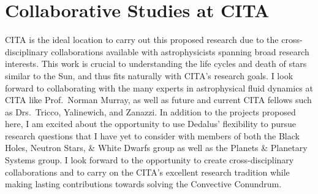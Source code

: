 \documentclass[preprint, hmargin=1in, vmargin=1in]{aastex62}
\begin{document}
\section*{\textbf{Collaborative Studies at CITA}}
CITA is the ideal location to carry out this proposed research due to the cross-disciplinary collaborations available with astrophysicists spanning broad research interests.
This work is crucial to understanding the life cycles and death of stars similar to the Sun, and thus fits naturally with CITA's research goals.
I look forward to collaborating with the many experts in astrophysical fluid dynamics at CITA like Prof.~Norman Murray, as well as future and current CITA fellows such as Drs.~Tricco, Yalinewich, and Zanazzi.
In addition to the projects proposed here, I am excited about the opportunity to use Dedalus' flexibility to pursue research questions that I have yet to consider with members of both the Black Holes, Neutron Stars, \& White Dwarfs group as well as the Planets \& Planetary Systems group.
I look forward to the opportunity to create cross-disciplinary collaborations and to carry on the CITA's excellent research tradition while making lasting contributions towards solving the Convective Conundrum.



\end{document}
